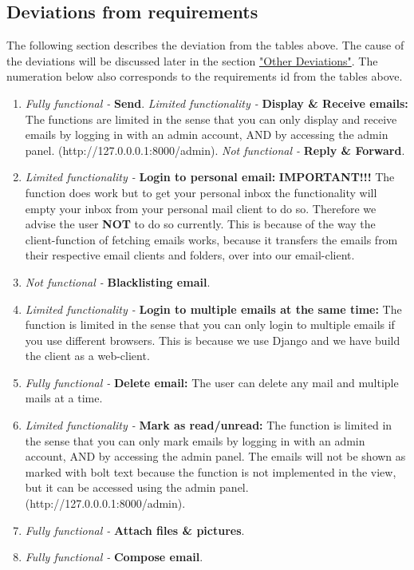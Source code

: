 \documentclass{article}
\begin{document}
\subsection*{Deviations from requirements}
The following section describes the deviation from the tables above. The cause of the deviations will be discussed later in the section \hyperref[sec:deviations]{"Other Deviations"}. The numeration below also corresponds to the requirements id from the tables above.
\begin{enumerate}
    \item \textit{Fully functional - }\textbf{Send}. 
    \newline \textit{Limited functionality - }\textbf{Display \& Receive emails: } The functions are limited in the sense that you can only display and receive emails by logging in with an admin account, AND by accessing the admin panel. (http://127.0.0.0.1:8000/admin).
    \newline \textit{Not functional - }\textbf{Reply \& Forward}.
    
    \item  \textit{Limited functionality - }\textbf{Login to personal email: }\textbf{IMPORTANT!!!} The function does work but to get your personal inbox the functionality will empty your inbox from your personal mail client to do so. Therefore we advise the user \textbf{NOT} to do so currently. This is because of the way the client-function of fetching emails works, because it transfers the emails from their respective email clients and folders, over into our email-client.
    
    \item \textit{Not functional - }\textbf{Blacklisting email}.
    
    \item \textit{Limited functionality - }\textbf{Login to multiple emails at the same time: } The function is limited in the sense that you can only login to multiple emails if you use different browsers. This is because we use Django and we have build the client as a web-client.
    
    
    \item \textit{Fully functional - }\textbf{Delete email: } The user can delete any mail and multiple mails at a time.
    
    
    \item \textit{Limited functionality - }\textbf{Mark as read/unread:} The function is limited in the sense that you can only mark emails by logging in with an admin account, AND by accessing the admin panel. The emails will not be shown as marked with bolt text because the function is not implemented in the view, but it can be accessed using the admin panel. (http://127.0.0.0.1:8000/admin).
    
    \item \textit{Fully functional - }\textbf{Attach files \& pictures}.
    
    
    \item \textit{Fully functional - }\textbf{Compose email}. 
    
\end{enumerate}
\end{document}

